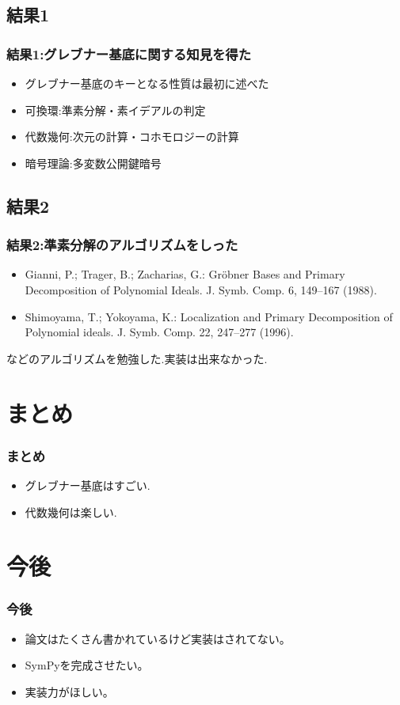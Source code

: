 \documentclass[dvipdfmx,22pt,notheorems]{beamer}
\theoremstyle{definition}
\begin{document}
\subsection{結果1}
\begin{frame}
	\frametitle{結果1:グレブナー基底に関する知見を得た}
		\begin{itemize}
		\item \Large グレブナー基底のキーとなる性質は最初に述べた
		\item \Large 可換環:準素分解・素イデアルの判定
		\item \Large 代数幾何:次元の計算・コホモロジーの計算
		\item \Large 暗号理論:多変数公開鍵暗号
		\end{itemize}
\end{frame}
\subsection{結果2}
\begin{frame}
	\frametitle{結果2:準素分解のアルゴリズムをしった}
		\begin{itemize}
		\item Gianni, P.; Trager, B.; Zacharias, G.: Gröbner Bases and
Primary Decomposition of Polynomial Ideals. J. Symb. Comp.
6, 149–167 (1988).
		\item Shimoyama, T.; Yokoyama, K.: Localization and Primary
Decomposition of Polynomial ideals. J. Symb. Comp. 22,
247–277 (1996).
		\end{itemize}
		などのアルゴリズムを勉強した.実装は出来なかった.
\end{frame}
\section{まとめ}
\begin{frame}
	\frametitle{まとめ}
			\begin{itemize}
			\item \Huge グレブナー基底はすごい.
			\item \Huge 代数幾何は楽しい.
		\end{itemize}
\end{frame}
\section{今後}
\begin{frame}
	\frametitle{今後}
		\begin{itemize}
			\item \Large 論文はたくさん書かれているけど実装はされてない。
			\item \Large SymPyを完成させたい。
			\item \Large 実装力がほしい。
		\end{itemize}
\end{frame}
\end{document}
